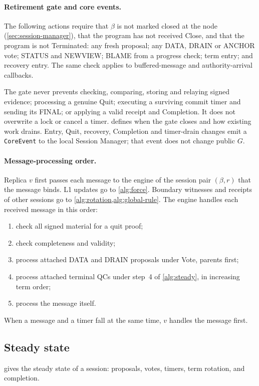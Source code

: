 \documentclass[11pt,a4paper]{article}
\newcommand{\RR}[1]{{\color{rrRed}#1}}
\begin{document}
\paragraph{Retirement gate and core events.}
The following actions require that $\beta$ is not marked closed at the
node (\cref{sec:session-manager}), that the program has not
received Close, and that the program is not
Terminated: any fresh proposal; any DATA, DRAIN or ANCHOR vote; STATUS
and NEWVIEW; BLAME from a progress check; term entry; and recovery entry.
The same check applies to buffered-message and authority-arrival
callbacks.

The gate never prevents checking, comparing, storing and relaying signed
evidence; processing a genuine Quit; executing a surviving commit timer
and sending its FINAL; or applying a valid receipt and Completion. It
does not overwrite a lock or cancel a timer. 
defines when the gate closes and how existing work drains. Entry, Quit,
recovery, Completion and timer-drain changes emit a \texttt{CoreEvent} to
the local Session Manager; that event does not change public $G$.

\paragraph{Message-processing order.}\leavevmode
\RR{Replica $v$ first passes each message to the engine of the session
pair $(\beta,r)$ that the message binds. L1 updates go to \cref{alg:force}. Boundary witnesses and receipts of
other sessions go to \cref{alg:rotation,alg:global-rule}.} The engine handles each received
message in this order:
\begin{enumerate}[label=(\arabic*)]
\item check all signed material for a quit proof;
\item check completeness and validity;
\item process attached DATA \RR{and DRAIN} proposals under Vote, parents
first;
\item process attached terminal QCs under step~4 of \cref{alg:steady},
in increasing term order;
\item process the message itself.
\end{enumerate}
When a message and a timer fall at the same time, $v$ handles the
message first.

\subsection{Steady state}
\label{sec:steady}
 gives the steady state of a session: proposals, votes,
timers, term rotation, and completion.
\end{document}
